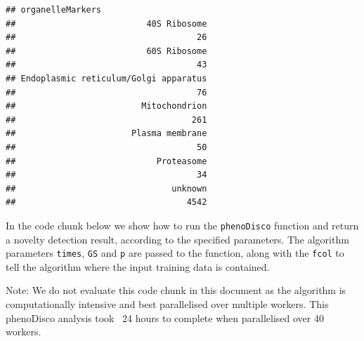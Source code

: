\begin{knitrout}
\color{fgcolor}\begin{kframe}
\begin{alltt}
  \hlstd{=} \hlstd{)}
\end{alltt}
\begin{verbatim}
## organelleMarkers
##                          40S Ribosome 
##                                    26 
##                          60S Ribosome 
##                                    43 
## Endoplasmic reticulum/Golgi apparatus 
##                                    76 
##                         Mitochondrion 
##                                   261 
##                       Plasma membrane 
##                                    50 
##                            Proteasome 
##                                    34 
##                               unknown 
##                                  4542
\end{verbatim}
\end{kframe}
\end{knitrout}

In the code chunk below we show how to run the \texttt{phenoDisco}
function and return a novelty detection result, according to the
specified parameters. The algorithm parameters \texttt{times}, \texttt{GS} and \texttt{p}
are passed to the function, along with the \texttt{fcol} to tell the
algorithm where the input training data is contained. 

\begin{knitrout}
\color{fgcolor}\begin{kframe}
\begin{alltt}
 \hlkwb{<-}   \hlstd{=} \hlstd{,}  \hlstd{=} \hlstd{,}  \hlstd{=} \hlstd{)}
\end{alltt}
\end{kframe}
\end{knitrout}

Note: We do not evaluate this code chunk in this document as the
algorithm is computationally intensive and best parallelised over
multiple workers. This phenoDisco analysis took ~24 hours to complete
when parallelised over 40 workers.


